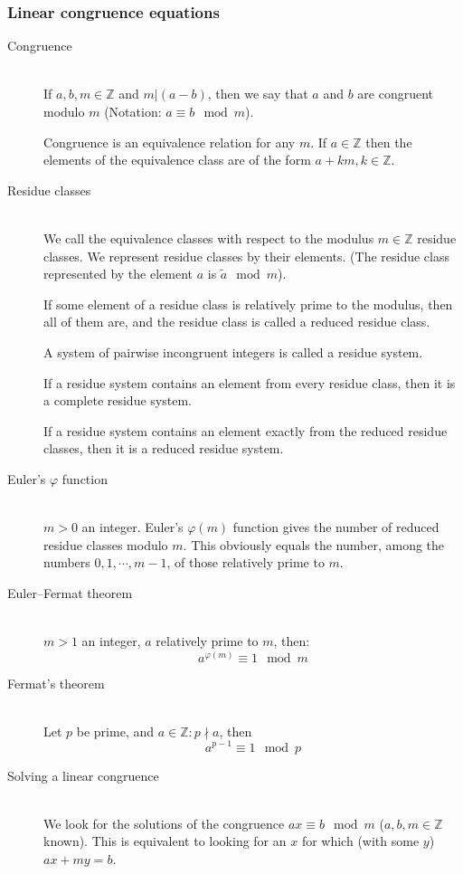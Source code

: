 \documentclass[margin=0px]{article}
\newcommand{\Z}{\mathbb{Z}}
\begin{document}
\subsubsection{Linear congruence equations}
\begin{description}
    \item[Congruence] \hfill \\
        If $a,b,m \in\Z$ and $m|(a-b)$, then we say that $a$ and $b$ are congruent modulo $m$ (Notation: ${a \equiv b \mod{m}}$).

        Congruence is an equivalence relation for any $m$. If $a\in\Z$ then the elements of the equivalence class are of the form $a+km, k\in\Z$.
    \item[Residue classes] \hfill \\
        We call the equivalence classes with respect to the modulus $m\in\Z$ residue classes. We represent residue classes by their elements. (The residue class represented by the element $a$ is $\widetilde{a} \mod{m}$).

        If some element of a residue class is relatively prime to the modulus, then all of them are, and the residue class is called a reduced residue class.

        A system of pairwise incongruent integers is called a residue system.

        If a residue system contains an element from every residue class, then it is a complete residue system.

        If a residue system contains an element exactly from the reduced residue classes, then it is a reduced residue system.
    \item[Euler's $\varphi$ function] \hfill \\
        $m > 0$ an integer. Euler's $\varphi(m)$ function gives the number of reduced residue classes modulo $m$. This obviously equals the number, among the numbers $0,1,\cdots,m-1$, of those relatively prime to $m$.
    \item[Euler--Fermat theorem] \hfill \\
        $m>1$ an integer, $a$ relatively prime to $m$, then:
        \[a^{\varphi(m)}\equiv 1 \mod{m}\]
    \item[Fermat's theorem] \hfill \\
        Let $p$ be prime, and $a\in\Z: p\nmid a$, then
        \[a^{p-1}\equiv 1 \mod p \]
    \item[Solving a linear congruence] \hfill \\
        We look for the solutions of the congruence $ax \equiv b \mod{m}$ ($a,b,m\in\Z$ known). This is equivalent to looking for an $x$ for which (with some $y$) $ax+my = b$.


\end{description}
\end{document}
